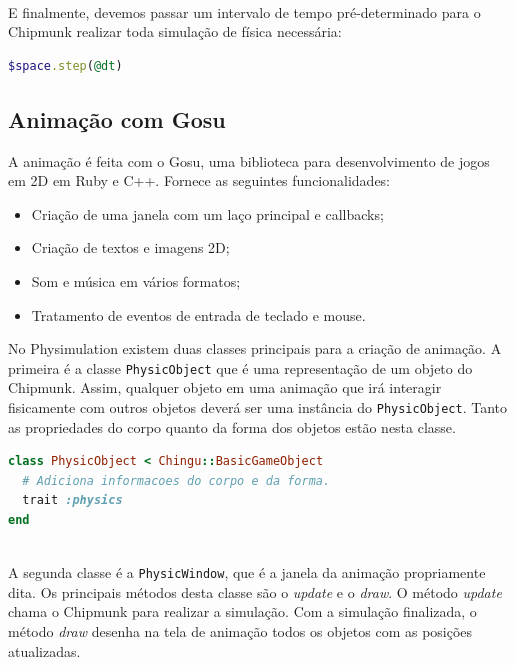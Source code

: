 \ \\
\hspace*{14pt} E finalmente, devemos passar um intervalo de tempo pré-determinado para o Chipmunk realizar toda simulação de física necessária:

\begin{lstlisting}[language=Ruby, caption=physics.rb]
  $space.step(@dt)
\end{lstlisting}

\newpage
\subsection{Animação com Gosu}
A animação é feita com o Gosu, uma biblioteca para desenvolvimento de jogos em 2D em Ruby e C++. Fornece as seguintes funcionalidades:
\begin{itemize}
  \item Criação de uma janela com um laço principal e callbacks;
  \item Criação de textos e imagens 2D;
  \item Som e música em vários formatos;
  \item Tratamento de eventos de entrada de teclado e mouse.
\end{itemize}

No Physimulation existem duas classes principais para a criação de animação. A primeira é a classe {\tt PhysicObject} que é uma representação de um objeto do
Chipmunk. Assim, qualquer objeto em uma animação que irá interagir fisicamente com outros objetos deverá ser uma instância do {\tt PhysicObject}. Tanto as propriedades do corpo quanto da forma dos objetos estão nesta classe.

\begin{lstlisting}[language=Ruby, caption=physics.rb]
class PhysicObject < Chingu::BasicGameObject
  # Adiciona informacoes do corpo e da forma.
  trait :physics
end
\end{lstlisting}

\ \\
\hspace*{14pt} A segunda classe é a {\tt PhysicWindow}, que é a janela da animação propriamente dita.
Os principais métodos desta classe são o \textit{update} e o \textit{draw}. O método \textit{update} chama o Chipmunk para realizar a simulação. Com a simulação finalizada, o método \textit{draw} desenha na tela de animação todos os objetos com as posições atualizadas. 

